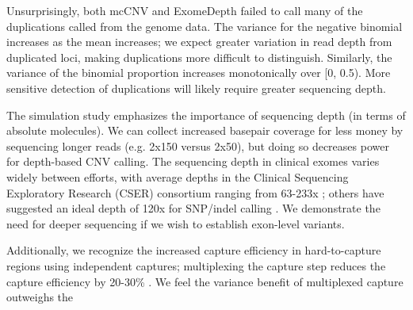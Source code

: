 \documentclass{bmcart}\usepackage[]{graphicx}\usepackage[]{color}
\begin{document}
Unsurprisingly, both mcCNV and ExomeDepth failed to call many of the duplications called from the genome data.
The variance for the negative binomial increases as the mean increases; we expect greater variation in read depth from duplicated loci, making duplications more difficult to distinguish.
Similarly, the variance of the binomial proportion increases monotonically over [0, 0.5).
More sensitive detection of duplications will likely require greater sequencing depth.


The simulation study emphasizes the importance of sequencing depth (in terms of absolute molecules).
We can collect increased basepair coverage for less money by sequencing longer reads (e.g. 2x150 versus 2x50), but doing so decreases power for depth-based CNV calling.
The sequencing depth in clinical exomes varies widely between efforts, with average depths in the Clinical Sequencing Exploratory Research (CSER) consortium ranging from 63-233x \cite{green:2016aa}; others have suggested an ideal depth of 120x for SNP/indel calling \cite{kim:2015ab}.
We demonstrate the need for deeper sequencing if we wish to establish exon-level variants.

Additionally, we recognize the increased capture efficiency in hard-to-capture regions using independent captures; multiplexing the capture step reduces the capture efficiency by 20-30\% \cite{trost:2018aa}.
We feel the variance benefit of multiplexed capture outweighs the 

\end{document}

